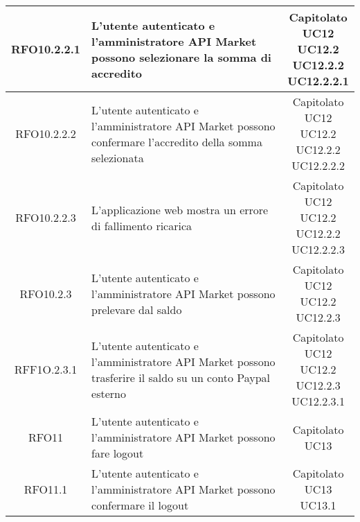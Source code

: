 \begin{longtable}{|c|p{8cm}|c|}
\hypertarget{RFO10.2.2.1}{RFO10.2.2.1} &  L'utente autenticato e l'amministratore API Market possono selezionare la somma di accredito & \makecell*{Capitolato\\UC12\\UC12.2\\UC12.2.2\\UC12.2.2.1} \\
\hline

\hypertarget{RFO10.2.2.2}{RFO10.2.2.2} &  L'utente autenticato e l'amministratore API Market possono confermare l'accredito della somma selezionata & \makecell*{Capitolato\\UC12\\UC12.2\\UC12.2.2\\UC12.2.2.2} \\
\hline

\hypertarget{RFO10.2.2.3}{RFO10.2.2.3} &  L'applicazione web mostra un errore di fallimento ricarica & \makecell*{Capitolato\\UC12\\UC12.2\\UC12.2.2\\UC12.2.2.3} \\
\hline

\hypertarget{RFO10.2.3}{RFO10.2.3} &  L'utente autenticato e l'amministratore API Market possono prelevare dal saldo & \makecell*{Capitolato\\UC12\\UC12.2\\UC12.2.3} \\
\hline

\hypertarget{RFF10.2.3.1}{RFF1O.2.3.1} &  L'utente autenticato e l'amministratore API Market possono trasferire il saldo su un conto Paypal esterno & \makecell*{Capitolato\\UC12\\UC12.2\\UC12.2.3\\UC12.2.3.1} \\
\hline

\hypertarget{RFO11}{RFO11} &  L'utente autenticato e l'amministratore API Market possono fare logout & \makecell*{Capitolato\\UC13} \\
\hline

\hypertarget{RFO11.1}{RFO11.1} &  L'utente autenticato e l'amministratore API Market possono confermare il logout & \makecell*{Capitolato\\UC13\\UC13.1} \\
\hline


\end{longtable}
